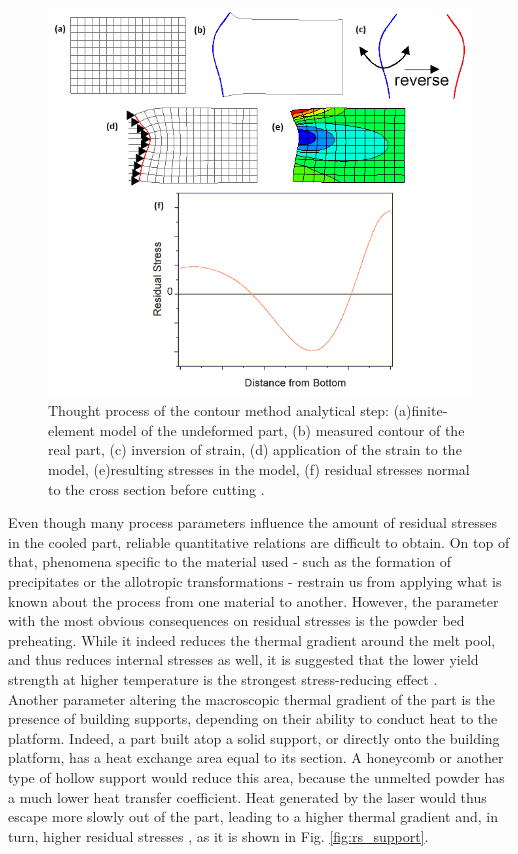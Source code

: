 \begin{figure}[ht]
	\centering
	\includegraphics[scale=0.60]{Images/contour_meth}
	\decoRule
	\caption[Thought process of the contour method analytical step]{Thought process of the contour method analytical step: (a)finite-element model of the undeformed part, (b) measured contour of the real part, (c) inversion of strain, (d) application of the strain to the model, (e)resulting stresses in the model, (f) residual stresses normal to the cross section before cutting \parencite{LANL}.}
	\label{fig:contour_meth}
\end{figure}


Even though many process parameters influence the amount of residual stresses in the cooled part, reliable quantitative relations are difficult to obtain. On top of that, phenomena specific to the material used - such as the formation of precipitates or the allotropic transformations - restrain us from applying what is known about the process from one material to another. However, the parameter with the most obvious consequences on residual stresses is the powder bed preheating. While it indeed reduces the thermal gradient around the melt pool, and thus reduces internal stresses as well, it is suggested that the lower yield strength at higher temperature is the strongest stress-reducing effect \cite{Vrancken2016}. \\

Another parameter altering the macroscopic thermal gradient of the part is the presence of building supports, depending on their ability to conduct heat to the platform. Indeed, a part built atop a solid support, or directly onto the building platform, has a heat exchange area equal to its section. A honeycomb or another type of hollow support would reduce this area, because the unmelted powder has a much lower heat transfer coefficient\cite{Hodge2014}. Heat generated by the laser would thus escape more slowly out of the part, leading to a higher thermal gradient and, in turn, higher residual stresses \cite{Salmi2017}, as it is shown in Fig. \ref{fig:rs_support}.\\

